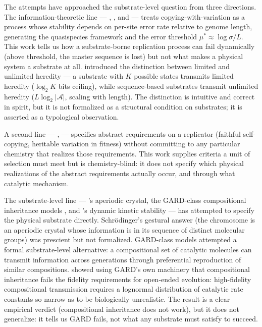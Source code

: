 \documentclass[aps,prx,reprint,amsmath,amssymb,floatfix,superscriptaddress,nofootinbib]{revtex4-2}
\theoremstyle{plain-thm}
\theoremstyle{definition-thm}
\begin{document}
The attempts have approached the substrate-level question from three directions. The information-theoretic line --- \citet{Eigen1971}, \citet{EigenMcCaskillSchuster1989}, and \citet{Szathmary2000} --- treats copying-with-variation as a process whose stability depends on per-site error rate relative to genome length, generating the quasispecies framework and the error threshold $\mu^* \approx \log \sigma / L$. This work tells us how a substrate-borne replication process can fail dynamically (above threshold, the master sequence is lost) but not what makes a physical system a substrate at all. \citet{Szathmary2000} introduced the distinction between limited and unlimited heredity --- a substrate with $K$ possible states transmits limited heredity ($\log_2 K$ bits ceiling), while sequence-based substrates transmit unlimited heredity ($L \log_2 |\mathcal{A}|$, scaling with length). The distinction is intuitive and correct in spirit, but it is not formalized as a structural condition on substrates; it is asserted as a typological observation.

A second line --- \citet{Hull1980}, \citet{MaynardSmith2000} --- specifies abstract requirements on a replicator (faithful self-copying, heritable variation in fitness) without committing to any particular chemistry that realizes those requirements. This work supplies criteria a unit of selection must meet but is chemistry-blind: it does not specify which physical realizations of the abstract requirements actually occur, and through what catalytic mechanism.

The substrate-level line --- \citet{Schrodinger1944}'s aperiodic crystal, the GARD-class compositional inheritance models \citep{Kauffman1986, Hordijk2012}, and \citet{Pross2011}'s dynamic kinetic stability --- has attempted to specify the physical substrate directly. Schr\"odinger's gestural answer (the chromosome is an aperiodic crystal whose information is in its sequence of distinct molecular groups) was prescient but not formalized. GARD-class models attempted a formal substrate-level alternative: a compositional set of catalytic molecules can transmit information across generations through preferential reproduction of similar compositions. \citet{Vasas2010} showed using GARD's own machinery that compositional inheritance fails the fidelity requirements for open-ended evolution: high-fidelity compositional transmission requires a lognormal distribution of catalytic rate constants so narrow as to be biologically unrealistic. The result is a clear empirical verdict (compositional inheritance does not work), but it does not generalize: it tells us GARD fails, not what any substrate must satisfy to succeed.
\end{document}
